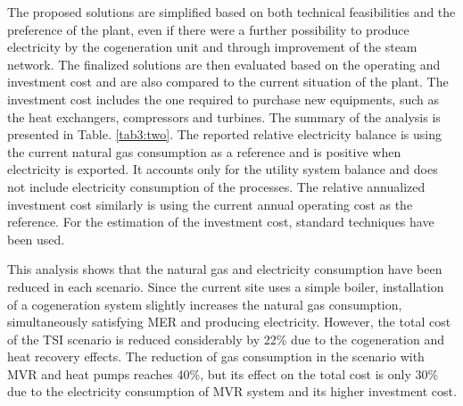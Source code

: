  The proposed solutions are simplified based on both technical feasibilities and the preference of the plant, even if there were a further possibility to produce electricity by the cogeneration unit and through improvement of the steam network. The finalized solutions are then evaluated based on the operating and investment cost and are also compared to the current situation of the plant. The investment cost includes the one required to purchase new equipments, such as the heat exchangers, compressors and turbines. The summary of the analysis is presented in Table. \ref{tab3:two}. The reported relative electricity balance is using the current natural gas consumption as a reference and is positive when electricity is exported. It accounts only for the utility system balance and does not include electricity consumption of the processes. The relative annualized investment cost similarly is using the current annual operating cost as the reference. For the estimation of the investment cost, standard techniques have been used. 
 
 \label{tab3:two}
 
 This analysis shows that the natural gas and electricity consumption have been reduced in each scenario. 
Since the current site uses a simple boiler, installation of a cogeneration system slightly increases the natural gas consumption, simultaneously satisfying MER and producing electricity. However, the total cost of the TSI scenario is reduced considerably by 22\% due to the cogeneration and heat recovery effects. The reduction of gas consumption in the scenario with MVR and heat pumps reaches 40\%, but its effect on the total cost is only 30\% due to the electricity consumption of MVR system and its higher investment cost.
 
 
